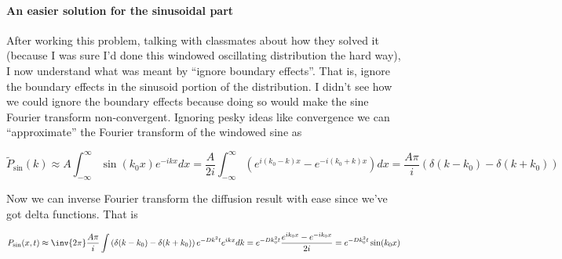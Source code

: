 {

\paragraph{An easier solution for the sinusoidal part}

After working this problem, talking with classmates about how they solved it (because I was sure I'd done this windowed oscillating distribution the hard way), I now understand what was meant by ``ignore boundary effects''.  That is, ignore the boundary effects in the sinusoid portion of the distribution.  I didn't see how we could ignore the boundary effects because doing so would make the sine Fourier transform non-convergent.  Ignoring pesky ideas like convergence we can ``approximate'' the Fourier transform of the windowed sine as

\begin{dmath}\label{eqn:basicStatMechProblemSet2Problem1:600}
\tilde{P}_{\mathrm{sin}}(k) 
\approx 
A \int_{-\infty}^\infty \sin (k_0 x) e^{-i k x} dx
=
\frac{A }{2 i} 
\int_{-\infty}^\infty 
\left(
e^{i (k_0 - k) x} 
-e^{-i (k_0 + k) x} \right)
dx
= 
\frac{A \pi}{i} \left( 
\delta(k - k_0) - \delta(k + k_0)
\right)
\end{dmath}

Now we can inverse Fourier transform the diffusion result with ease since we've got delta functions.  That is

\begin{dmath}\label{eqn:basicStatMechProblemSet2Problem1:620}
P_{\mathrm{sin}}(x, t) \approx
\inv{2 \pi} 
\frac{A \pi}{i} 
\int
\left( 
\delta(k - k_0) - \delta(k + k_0)
\right)
e^{-D k^2 t} e^{i k x} dk
=
e^{-D k_0^2 t} \frac{ e^{i k_0 x} - e^{-i k_0 x}}{2 i}
= 
e^{-D k_0^2 t} \sin( k_0 x )
\end{dmath}

}
